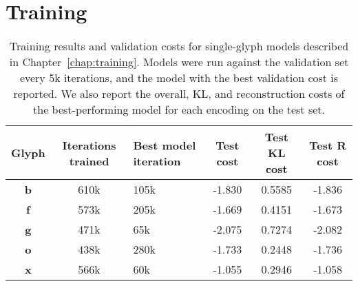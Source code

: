 \chapter{Training}\label{app:train}

\begin{table}[h]
\centering
    \caption[Training results for the single-glyph models]{Training results  and validation costs for single-glyph models described in Chapter~\ref{chap:training}.
    Models were run against the validation set every 5k iterations, and the model with the best validation cost is reported.
    We also report the overall, KL, and reconstruction costs of the best-performing model for each encoding on the test set.
    \label{apptbl:train-models}}
\begin{tabularx}{\textwidth}{c c X c c c}
\toprule
    Glyph & Iterations trained & Best model iteration & Test cost & Test KL cost & Test R cost \\ \midrule
    \textbf{b} & 610k & 105k & -1.830 & 0.5585 & -1.836 \\
    \textbf{f} & 573k & 205k & -1.669 & 0.4151 & -1.673 \\
    \textbf{g} & 471k & 65k & -2.075 & 0.7274 & -2.082 \\
    \textbf{o} & 438k & 280k & -1.733 & 0.2448 & -1.736 \\
    \textbf{x} & 566k & 60k & -1.055 & 0.2946 & -1.058 \\
\end{tabularx}
\end{table}

